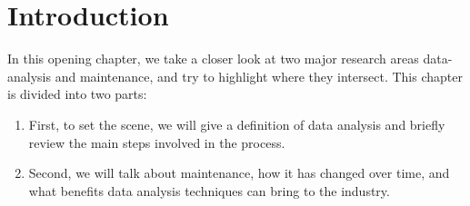 \chapter{Introduction}
In this opening chapter, we take a closer look at two major research areas data-analysis and maintenance, and try to highlight where they intersect.
This chapter is divided into two parts:
\begin{enumerate}
    \item First, to set the scene, we will give a definition of data analysis and briefly review the main steps involved in the process.
    \item Second, we will talk about maintenance, how it has changed over time, and what benefits data analysis techniques can bring to the industry.
\end{enumerate}





